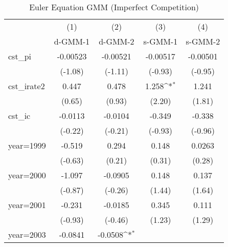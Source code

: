 \begin{table}[htbp]\centering
\def\sym#1{\ifmmode^{#1}\else\(^{#1}\)\fi}
\caption{Euler Equation GMM (Imperfect Competition)}
\begin{tabular}{l*{4}{c}}
\toprule
                    &\multicolumn{1}{c}{(1)}&\multicolumn{1}{c}{(2)}&\multicolumn{1}{c}{(3)}&\multicolumn{1}{c}{(4)}\\
                    &\multicolumn{1}{c}{d-GMM-1}&\multicolumn{1}{c}{d-GMM-2}&\multicolumn{1}{c}{s-GMM-1}&\multicolumn{1}{c}{s-GMM-2}\\
\midrule
cst\_pi              &    -0.00523         &    -0.00521         &    -0.00517         &    -0.00501         \\
                    &     (-1.08)         &     (-1.11)         &     (-0.93)         &     (-0.95)         \\
\addlinespace
cst\_irate2          &       0.447         &       0.478         &       1.258\sym{*}  &       1.241         \\
                    &      (0.65)         &      (0.93)         &      (2.20)         &      (1.81)         \\
\addlinespace
cst\_ic              &     -0.0113         &     -0.0104         &      -0.349         &      -0.338         \\
                    &     (-0.22)         &     (-0.21)         &     (-0.93)         &     (-0.96)         \\
\addlinespace
year=1999           &      -0.519         &       0.294         &       0.148         &      0.0263         \\
                    &     (-0.63)         &      (0.21)         &      (0.31)         &      (0.28)         \\
\addlinespace
year=2000           &      -1.097         &     -0.0905         &       0.148         &       0.137         \\
                    &     (-0.87)         &     (-0.26)         &      (1.44)         &      (1.64)         \\
\addlinespace
year=2001           &      -0.231         &     -0.0185         &       0.345         &       0.111         \\
                    &     (-0.93)         &     (-0.46)         &      (1.23)         &      (1.29)         \\
\addlinespace
year=2003           &     -0.0841         &     -0.0508\sym{*}  &                     &                     \\

\end{tabular}
\end{table}
